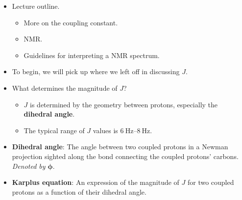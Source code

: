 \documentclass[../notes.tex]{subfiles}
\begin{document}
\begin{itemize}
\begin{itemize}
    \end{itemize}
    \item Lecture outline.
    \begin{itemize}
        \item More on the coupling constant.
        \item {} NMR.
        \item Guidelines for interpreting a  NMR spectrum.
    \end{itemize}
    \item To begin, we will pick up where we left off in discussing $J$.
    \item What determines the magnitude of $J$?
    \begin{itemize}
        \item $J$ is determined by the geometry between protons, especially the \textbf{dihedral angle}.
        \item The typical range of $J$ values is $\SIrange{6}{8}{\hertz}$.
    \end{itemize}
    \item \textbf{Dihedral angle}: The angle between two coupled protons in a Newman projection sighted along the  bond connecting the coupled protons' carbons. \emph{Denoted by} $\bm{\phi}$.
    \item \textbf{Karplus equation}: An expression of the magnitude of $J$ for two coupled protons as a function of their dihedral angle.
    \begin{figure}[h!]
        \centering
\end{figure}
\end{itemize}
\end{document}
